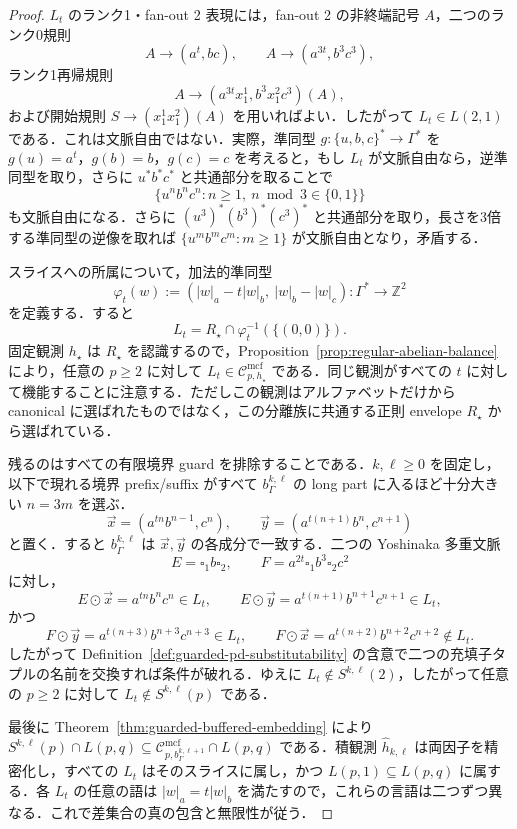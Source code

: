 \documentclass[11pt,a4paper]{ltjsarticle}
\numberwithin{equation}{section}
\theoremstyle{plain}
\theoremstyle{definition}
\theoremstyle{remark}
\newcommand{\Cmcf}[2]{\mathcal{C}^{\mathrm{mcf}}_{#1,#2}}
\newcommand{\tuple}[1]{\vec{#1}}
\newcommand{\blank}{\square}
\begin{document}
\begin{proof}
\(L_t\) のランク1・fan-out 2 表現には，fan-out 2 の非終端記号 \(A\)，二つのランク0規則
\[
 A\to(a^t,bc),\qquad A\to(a^{3t},b^3c^3),
\]
ランク1再帰規則
\[
 A\to(a^{3t}x_1^1,b^3x_1^2c^3)(A),
\]
および開始規則 \(S\to(x_1^1x_1^2)(A)\) を用いればよい．したがって \(L_t\in L(2,1)\) である．これは文脈自由ではない．実際，準同型
\(g:\{u,b,c\}^*\to\Gamma^*\) を \(g(u)=a^t\)，\(g(b)=b\)，\(g(c)=c\) を考えると，もし \(L_t\) が文脈自由なら，逆準同型を取り，さらに \(u^*b^*c^*\) と共通部分を取ることで
\[
 \{u^nb^nc^n:n\ge1,\ n\bmod3\in\{0,1\}\}
\]
も文脈自由になる．さらに
\((u^3)^*(b^3)^*(c^3)^*\) と共通部分を取り，長さを3倍する準同型の逆像を取れば \(\{u^mb^mc^m:m\ge1\}\) が文脈自由となり，矛盾する．

スライスへの所属について，加法的準同型
\[
 \varphi_t(w):=(|w|_a-t|w|_b,\ |w|_b-|w|_c):\Gamma^*\to\mathbb Z^2
\]
を定義する．すると
\[
 L_t=R_\star\cap\varphi_t^{-1}(\{(0,0)\}).
\]
固定観測 \(h_\star\) は \(R_\star\) を認識するので，Proposition~\ref{prop:regular-abelian-balance} により，任意の \(p\ge2\) に対して \(L_t\in\Cmcf{p}{h_\star}\) である．同じ観測がすべての \(t\) に対して機能することに注意する．ただしこの観測はアルファベットだけから canonical に選ばれたものではなく，この分離族に共通する正則 envelope \(R_\star\) から選ばれている．

残るのはすべての有限境界 guard を排除することである．\(k,\ell\ge0\) を固定し，以下で現れる境界 prefix/suffix がすべて \(b_\Gamma^{k,\ell}\) の long part に入るほど十分大きい \(n=3m\) を選ぶ．
\[
 \tuple x=(a^{tn}b^{n-1},c^n),\qquad
 \tuple y=(a^{t(n+1)}b^n,c^{n+1})
\]
と置く．すると \(b_\Gamma^{k,\ell}\) は \(\tuple x,\tuple y\) の各成分で一致する．二つの Yoshinaka 多重文脈
\[
 E=\blank_1 b\blank_2,
 \qquad
 F=a^{2t}\blank_1 b^3\blank_2c^2
\]
に対し，
\[
 E\odot\tuple x=a^{tn}b^nc^n\in L_t,
 \qquad
 E\odot\tuple y=a^{t(n+1)}b^{n+1}c^{n+1}\in L_t,
\]
かつ
\[
 F\odot\tuple y=a^{t(n+3)}b^{n+3}c^{n+3}\in L_t,
 \qquad
 F\odot\tuple x=a^{t(n+2)}b^{n+2}c^{n+2}\notin L_t.
\]
したがって Definition~\ref{def:guarded-pd-substitutability} の含意で二つの充填子タプルの名前を交換すれば条件が破れる．ゆえに \(L_t\notin S^{k,\ell}(2)\)，したがって任意の \(p\ge2\) に対して \(L_t\notin S^{k,\ell}(p)\) である．

最後に Theorem~\ref{thm:guarded-buffered-embedding} により
\(S^{k,\ell}(p)\cap L(p,q)\subseteq
\Cmcf{p}{b_\Gamma^{k,\ell+1}}\cap L(p,q)\) である．積観測
\(\widehat h_{k,\ell}\) は両因子を精密化し，すべての \(L_t\) はそのスライスに属し，かつ \(L(p,1)\subseteq L(p,q)\) に属する．各 \(L_t\) の任意の語は \(|w|_a=t|w|_b\) を満たすので，これらの言語は二つずつ異なる．これで差集合の真の包含と無限性が従う．
\end{proof}
\end{document}
